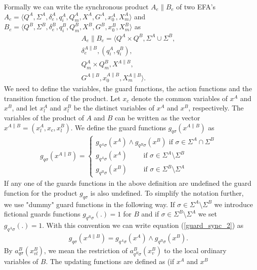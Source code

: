 \documentclass{article}
\begin{document}
Formally we can write the synchronous product $A_e \| B_e$ of two
EFA's $A_e=\langle Q^A, \Sigma^A, \delta^A_e, q^A_i, Q^A_m, X^A,
G^{A}, x^{A}_0, X^{A}_m \rangle$ and $B_e=\langle Q^B, \Sigma^B,
\delta^B_e, q^B_i, Q^B_m, X^B, G^{B}, x^{B}_0, X^{B}_m \rangle$ as
\begin{eqnarray}
A_e \| B_e=\langle Q^A\times Q^B, \Sigma^A \cup \Sigma^B ,\nonumber\\
\delta^{A\|B}_e, (q^{A}_i, q^{B}_i),\nonumber\\
 Q^A_m\times Q^B_m, X^{A\|B},\nonumber\\
G^{A\|B}, x^{A\|B}_0, X^{A\|B}_m\rangle.
\end{eqnarray}
We need to define the variables, the guard functions, the action
functions and the transition function of the product. Let $x_{c}$
denote the common variables of $x^{A}$ and $x^{B}$, and let
$x^A_l$ and $x^B_l$ be the distinct variables of $x^{A}$ and
$x^{B}$, respectively. The variables of the product of $A$ and $B$
can be written as the vector $x^{A\|B}=(x^A_l, x_{c}, x^B_l)$. We
define the guard functions $g_{q \sigma}(x^{A\|B})$ as
\begin{eqnarray}\label{guard_sync_2}
g_{q \sigma}(x^{A\|B})=\left\{
\begin{array}{ll}
g_{q^A\sigma}(x^{A})\wedge g_{q^B\sigma}(x^{B}) \textrm{ if }\sigma\in \Sigma^A \cap \Sigma^B\\
g_{q^A\sigma}(x^{A}) \quad\quad \textrm{ if } \sigma\in \Sigma^A \setminus \Sigma^B\\
g_{q^B\sigma}(x^{B}) \quad\quad \textrm{ if }
\sigma\in\Sigma^B\setminus \Sigma^A
\end{array}\right.
\end{eqnarray}
If any one of the guards functions in the above definition are
undefined the guard function for the product $g_{q \sigma}$ is
also undefined. To simplify the notation further, we use "dummy"
guard functions in the following way. If $\sigma\in \Sigma^A
\setminus \Sigma^B$ we introduce fictional guards functions
$g_{q^B\sigma}(.)=1$ for $B$ and if $\sigma\in\Sigma^B\setminus
\Sigma^A$ we set $g_{q^A\sigma}(.)=1$. With this convention we can
write equation (\ref{guard_sync_2}) as
\begin{eqnarray}
g_{q \sigma}(x^{A\|B})= g_{q^A\sigma}(x^{A})\wedge
g_{q^B\sigma}(x^{B}).
\end{eqnarray}
By $a^B_{q \sigma}(x^{B}_{vl})$, we mean the restriction of
$a^B_{q^B \sigma}(x^{B}_{v})$ to the local ordinary variables of
$B$. The updating functions are defined as (if $x^{A}$ and $x^{B}$
\end{document}
